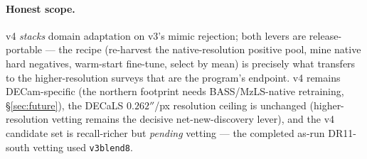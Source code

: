 \paragraph{Honest scope.} v4 \emph{stacks} domain adaptation on v3's mimic rejection; both levers are
release-portable --- the recipe (re-harvest the native-resolution positive pool, mine native hard
negatives, warm-start fine-tune, select by mean) is precisely what transfers to the higher-resolution
surveys that are the program's endpoint. v4 remains DECam-specific (the northern footprint needs
BASS/MzLS-native retraining, \S\ref{sec:future}), the DECaLS $0.262''$/px resolution ceiling is
unchanged (higher-resolution vetting remains the decisive net-new-discovery lever), and the v4 candidate
set is recall-richer but \emph{pending} vetting --- the completed as-run DR11-south vetting used
\texttt{v3blend8}.
